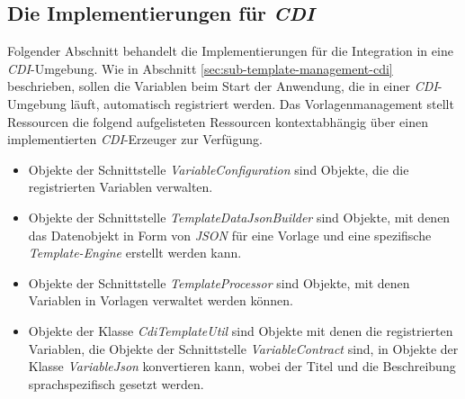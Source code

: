 \subsection{Die Implementierungen für \emph{CDI}}
\label{sec:sub-impl-integartion-cdi}
Folgender Abschnitt behandelt die Implementierungen für die Integration in eine \emph{CDI}-Umgebung. Wie in Abschnitt \ref{sec:sub-template-management-cdi} beschrieben, sollen die Variablen beim Start der Anwendung, die in einer \emph{CDI}-Umgebung läuft, automatisch  registriert werden. Das Vorlagenmanagement stellt Ressourcen die folgend aufgelisteten Ressourcen kontextabhängig über einen implementierten \emph{CDI}-Erzeuger zur Verfügung. 
\begin{itemize}
 \item Objekte der Schnittstelle \emph{VariableConfiguration} sind Objekte, die die registrierten Variablen verwalten.
 \item Objekte der Schnittstelle \emph{TemplateDataJsonBuilder} sind Objekte, mit denen das Datenobjekt in Form von \emph{JSON} für eine Vorlage und eine spezifische \emph{Template-Engine} erstellt werden kann.
 \item Objekte der Schnittstelle \emph{TemplateProcessor} sind Objekte, mit denen Variablen in Vorlagen verwaltet werden können.
 \item Objekte der Klasse \emph{CdiTemplateUtil} sind Objekte mit denen die registrierten Variablen, die Objekte der Schnittstelle \emph{VariableContract} sind, in Objekte der Klasse \emph{VariableJson} konvertieren kann, wobei der Titel und die Beschreibung sprachspezifisch gesetzt werden.
\end{itemize}

